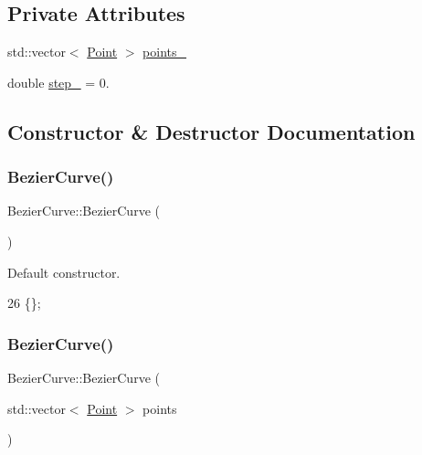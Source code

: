 \subsection*{Private Attributes}
\begin{DoxyCompactItemize}
\item 
std\+::vector$<$ \mbox{\hyperlink{class_point}{Point}} $>$ \mbox{\hyperlink{class_bezier_curve_a73c8f89d9002be75295e6a0546547189}{points\+\_\+}}
\item 
double \mbox{\hyperlink{class_bezier_curve_a308d7d0afc02da11ed0020508d537818}{step\+\_\+}} = 0.
\end{DoxyCompactItemize}


\subsection{Constructor \& Destructor Documentation}
\mbox{\label{class_bezier_curve_af30b8df568e50499b596aff578198425}} 
\subsubsection{\texorpdfstring{Bezier\+Curve()}{BezierCurve()}\hspace{0.1cm}{\footnotesize\ttfamily [1/2]}}
{\footnotesize\ttfamily Bezier\+Curve\+::\+Bezier\+Curve (\begin{DoxyParamCaption}{ }\end{DoxyParamCaption})\hspace{0.3cm}{\ttfamily [inline]}}



Default constructor. 


\begin{DoxyCode}
26 \{\};
\end{DoxyCode}
\mbox{\label{class_bezier_curve_abf9565fc1a6be43b0f1503e2db52ffd1}} 
\subsubsection{\texorpdfstring{Bezier\+Curve()}{BezierCurve()}\hspace{0.1cm}{\footnotesize\ttfamily [2/2]}}
{\footnotesize\ttfamily Bezier\+Curve\+::\+Bezier\+Curve (\begin{DoxyParamCaption}\item[{std\+::vector$<$ \mbox{\hyperlink{class_point}{Point}} $>$}]{points }\end{DoxyParamCaption})}



